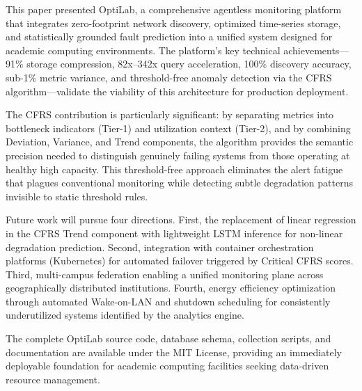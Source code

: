 \documentclass{ieeeaccess}
\begin{document}
This paper presented OptiLab, a comprehensive agentless monitoring platform that integrates zero-footprint network discovery, optimized time-series storage, and statistically grounded fault prediction into a unified system designed for academic computing environments. The platform's key technical achievements---91\% storage compression, 82x--342x query acceleration, 100\% discovery accuracy, sub-1\% metric variance, and threshold-free anomaly detection via the CFRS algorithm---validate the viability of this architecture for production deployment.

The CFRS contribution is particularly significant: by separating metrics into bottleneck indicators (Tier-1) and utilization context (Tier-2), and by combining Deviation, Variance, and Trend components, the algorithm provides the semantic precision needed to distinguish genuinely failing systems from those operating at healthy high capacity. This threshold-free approach eliminates the alert fatigue that plagues conventional monitoring while detecting subtle degradation patterns invisible to static threshold rules.

Future work will pursue four directions. First, the replacement of linear regression in the CFRS Trend component with lightweight LSTM inference for non-linear degradation prediction. Second, integration with container orchestration platforms (Kubernetes) for automated failover triggered by Critical CFRS scores. Third, multi-campus federation enabling a unified monitoring plane across geographically distributed institutions. Fourth, energy efficiency optimization through automated Wake-on-LAN and shutdown scheduling for consistently underutilized systems identified by the analytics engine.

The complete OptiLab source code, database schema, collection scripts, and documentation are available under the MIT License, providing an immediately deployable foundation for academic computing facilities seeking data-driven resource management.

\EOD
\end{document}
